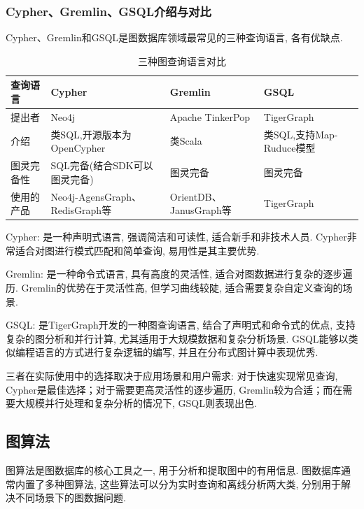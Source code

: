 \documentclass[12pt,hyperref,a4paper,UTF8]{ctexart}
\begin{document}
\subsubsection*{Cypher、Gremlin、GSQL介绍与对比}
Cypher、Gremlin和GSQL是图数据库领域最常见的三种查询语言, 各有优缺点.
\begin{table}[htbp]
	\centering
	\caption{三种图查询语言对比}
	\begin{tabularx}{\textwidth}{|X|X|X|X| }
		\hline
		查询语言  & Cypher                       & Gremlin              & GSQL                \\
		\hline
		提出者   & Neo4j                        & Apache TinkerPop     & TigerGraph          \\
		\hline
		介绍    & 类SQL,开源版本为OpenCypher         & 类Scala               & 类SQL,支持Map-Ruduce模型 \\
		\hline
		图灵完备性 & SQL完备(结合SDK可以图灵完备)           & 图灵完备                 & 图灵完备                \\
		\hline
		使用的产品 & Neo4j-AgensGraph、RedisGraph等 & OrientDB、JanusGraph等 & TigerGraph          \\
		\hline
	\end{tabularx}%
	\label{tab:addlabel}%
\end{table}%

Cypher: 是一种声明式语言, 强调简洁和可读性, 适合新手和非技术人员. Cypher非常适合对图进行模式匹配和简单查询, 易用性是其主要优势.

Gremlin: 是一种命令式语言, 具有高度的灵活性, 适合对图数据进行复杂的逐步遍历. Gremlin的优势在于灵活性高, 但学习曲线较陡, 适合需要复杂自定义查询的场景.

GSQL: 是TigerGraph开发的一种图查询语言, 结合了声明式和命令式的优点, 支持复杂的图分析和并行计算, 尤其适用于大规模数据和复杂分析场景. GSQL能够以类似编程语言的方式进行复杂逻辑的编写, 并且在分布式图计算中表现优秀.

三者在实际使用中的选择取决于应用场景和用户需求: 对于快速实现常见查询, Cypher是最佳选择；对于需要更高灵活性的逐步遍历, Gremlin较为合适；而在需要大规模并行处理和复杂分析的情况下, GSQL则表现出色.

\subsection{图算法}

图算法是图数据库的核心工具之一, 用于分析和提取图中的有用信息. 图数据库通常内置了多种图算法, 这些算法可以分为实时查询和离线分析两大类, 分别用于解决不同场景下的图数据问题.
\end{document}
